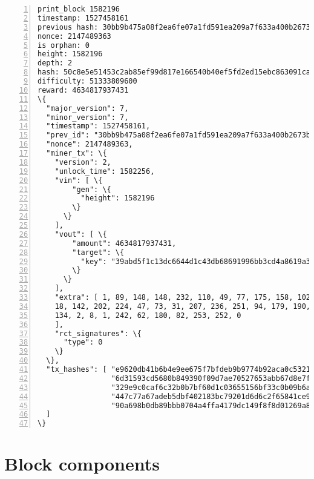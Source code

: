 \begin{appendices}
\begin{Verbatim}[commandchars=\\\{\}, numbers=left]
print_block 1582196
timestamp: 1527458161
previous hash: 30bb9b475a08f2ea6fe07a1fd591ea209a7f633a400b2673b8835a975348b0eb
nonce: 2147489363
is orphan: 0
height: 1582196
depth: 2
hash: 50c8e5e51453c2ab85ef99d817e166540b40ef5fd2ed15ebc863091ca2a04594
difficulty: 51333809600
reward: 4634817937431
\{
  "major_version": 7,
  "minor_version": 7,
  "timestamp": 1527458161,
  "prev_id": "30bb9b475a08f2ea6fe07a1fd591ea209a7f633a400b2673b8835a975348b0eb",
  "nonce": 2147489363,
  "miner_tx": \{
    "version": 2,
    "unlock_time": 1582256,
    "vin": [ \{
        "gen": \{
          "height": 1582196
        \}
      \}
    ],
    "vout": [ \{
        "amount": 4634817937431,
        "target": \{
          "key": "39abd5f1c13dc6644d1c43db68691996bb3cd4a8619a37a227667cf2bf055401"
        \}
      \}
    ],
    "extra": [ 1, 89, 148, 148, 232, 110, 49, 77, 175, 158, 102, 45, 72, 201, 193,
    18, 142, 202, 224, 47, 73, 31, 207, 236, 251, 94, 179, 190, 71, 72, 251, 110, 
    134, 2, 8, 1, 242, 62, 180, 82, 253, 252, 0
    ],
    "rct_signatures": \{
      "type": 0
    \}
  \},
  "tx_hashes": [ "e9620db41b6b4e9ee675f7bfdeb9b9774b92aca0c53219247b8f8c7aecf773ae",
                 "6d31593cd5680b849390f09d7ae70527653abb67d8e7fdca9e0154e5712591bf",
                 "329e9c0caf6c32b0b7bf60d1c03655156bf33c0b09b6a39889c2ff9a24e94a54",
                 "447c77a67adeb5dbf402183bc79201d6d6c2f65841ce95cf03621da5a6bffefc",
                 "90a698b0db89bbb0704a4ffa4179dc149f8f8d01269a85f46ccd7f0007167ee4"
  ]
\}
\end{Verbatim}



\section*{Block components}


\end{appendices}

